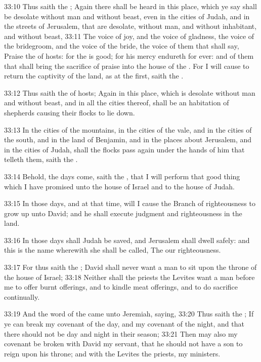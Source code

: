 33:10 Thus saith the \LORD; Again there shall be heard in this place, which ye say shall be desolate without man and without beast, even in the cities of Judah, and in the streets of Jerusalem, that are desolate, without man, and without inhabitant, and without beast, 33:11 The voice of joy, and the voice of gladness, the voice of the bridegroom, and the voice of the bride, the voice of them that shall say, Praise the \LORD of hosts: for the \LORD is good; for his mercy endureth for ever: and of them that shall bring the sacrifice of praise into the house of the \LORD. For I will cause to return the captivity of the land, as at the first, saith the \LORD.

33:12 Thus saith the \LORD of hosts; Again in this place, which is desolate without man and without beast, and in all the cities thereof, shall be an habitation of shepherds causing their flocks to lie down.

33:13 In the cities of the mountains, in the cities of the vale, and in the cities of the south, and in the land of Benjamin, and in the places about Jerusalem, and in the cities of Judah, shall the flocks pass again under the hands of him that telleth them, saith the \LORD.

33:14 Behold, the days come, saith the \LORD, that I will perform that good thing which I have promised unto the house of Israel and to the house of Judah.

33:15 In those days, and at that time, will I cause the Branch of righteousness to grow up unto David; and he shall execute judgment and righteousness in the land.

33:16 In those days shall Judah be saved, and Jerusalem shall dwell safely: and this is the name wherewith she shall be called, The \LORD our righteousness.

33:17 For thus saith the \LORD; David shall never want a man to sit upon the throne of the house of Israel; 33:18 Neither shall the priests the Levites want a man before me to offer burnt offerings, and to kindle meat offerings, and to do sacrifice continually.

33:19 And the word of the \LORD came unto Jeremiah, saying, 33:20 Thus saith the \LORD; If ye can break my covenant of the day, and my covenant of the night, and that there should not be day and night in their season; 33:21 Then may also my covenant be broken with David my servant, that he should not have a son to reign upon his throne; and with the Levites the priests, my ministers.

